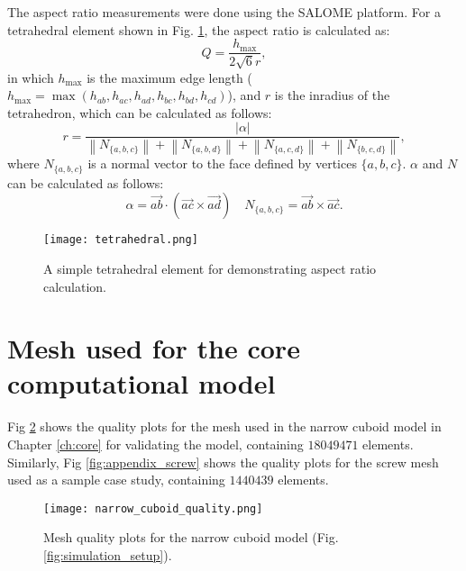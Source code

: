 The aspect ratio measurements were done using the SALOME platform. For a  tetrahedral element shown in Fig. \ref{fig:appendix_tetrahedral}, the aspect ratio is calculated as:
\begin{equation}
Q=\frac{h_{\max }}{2 \sqrt{6} r},
\end{equation}
in which $h_{\max}$ is the maximum edge length ($h_{\max }=\max \left(h_{a b}, h_{a c}, h_{a d}, h_{b c}, h_{b d}, h_{c d}\right)$), and $r$ is the inradius of the tetrahedron, which can be calculated as follows: 
\begin{equation}
r=\frac{|\alpha|}{\left\|N_{\{a, b, c\}}\right\|+\left\|N_{\{a, b, d\}}\right\|+\left\|N_{\{a, c, d\}}\right\|+\left\|N_{\{b, c, d\}}\right\|},
\end{equation} 
where $N_{\{a, b, c\}}$ is a normal vector to the face defined by vertices $\{a, b, c\}$. $\alpha$ and $N$ can be calculated as follows:
\begin{equation}
\alpha=\overrightarrow{a b} \cdot(\overrightarrow{a c} \times \overrightarrow{a d}) \quad N_{\{a, b, c\}}=\overrightarrow{a b} \times \overrightarrow{a c}.
\end{equation}


\begin{figure}[h]
\centering
\medskip
\texttt{[image: tetrahedral.png]}
\caption[A simple tetrahedral element for demonstrating aspect ratio calculation]{A simple tetrahedral element for demonstrating aspect ratio calculation.} \label{fig:appendix_tetrahedral}
\end{figure}


\section{Mesh used for the core computational model}

Fig \ref{fig:appendix_narrow_cuboid} shows the quality plots for the mesh used in the narrow cuboid model in Chapter \ref{ch:core} for validating the model, containing $\num{18049471}$ elements. Similarly, Fig \ref{fig:appendix_screw} shows the quality plots for the screw mesh used as a sample case study, containing $\num{1440439}$ elements.

\begin{figure}[!h]
\centering
\medskip
\texttt{[image: narrow\_cuboid\_quality.png]}
\caption[Mesh quality plots for the narrow cuboid model]{Mesh quality plots for the narrow cuboid model (Fig. \ref{fig:simulation_setup}).} \label{fig:appendix_narrow_cuboid}
\end{figure}

